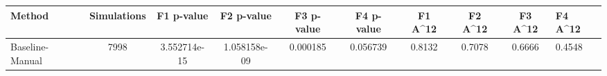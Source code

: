 \begin{tabular}{lcccccccc}
\toprule
         Method &  Simulations &   F1 p-value &   F2 p-value &  F3 p-value &  F4 p-value &  F1 A^12 &  F2 A^12 &  F3 A^12 &  F4 A^12 \\
\midrule
Baseline-Manual &         7998 & 3.552714e-15 & 1.058158e-09 &    0.000185 &    0.056739 &   0.8132 &   0.7078 &   0.6666 &   0.4548 \\
\bottomrule
\end{tabular}
